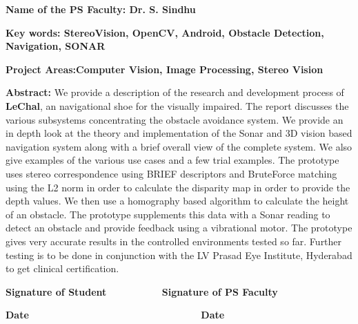 \documentclass[11pt]{report}
\begin{document}
{
\textbf{Name of the PS Faculty: Dr. S. Sindhu }


\bigskip

{
\textbf{Key words: StereoVision, OpenCV, Android, Obstacle Detection, Navigation, SONAR }\ }

{
\textbf{Project Areas:Computer Vision, Image Processing, Stereo Vision }\ }

{\bfseries
Abstract: }{We provide a description of the research  and development process of \textbf{LeChal}, an navigational shoe for the visually impaired. The report discusses the various subsystems concentrating the obstacle avoidance system. We provide an in depth look at the theory and implementation of the Sonar and 3D vision based navigation system along with a brief overall view of the complete system. We also give examples of the various use cases and a few trial examples. The prototype uses stereo correspondence using BRIEF\cite{brief} descriptors and BruteForce matching using the L2 norm in order to calculate the disparity map in order to provide the depth values. We then use a homography based algorithm to calculate the height of an obstacle\cite{obstacleavoidance}. The prototype supplements this data with a Sonar reading to detect an obstacle and provide feedback using a vibrational motor. The prototype gives very accurate results in the controlled environments tested so far. Further testing is to be done in conjunction with the LV Prasad Eye Institute, Hyderabad to get clinical certification.}


\bigskip


\bigskip


\bigskip


\bigskip


\bigskip


\bigskip


\bigskip


\bigskip


\bigskip





{\bfseries
Signature of Student\ \ \ \ \ \ \ \ \ \ Signature of PS Faculty}


\bigskip


\bigskip

{\bfseries
Date\ \ \ \ \ \ \ \ \ \ \ \ \ \ \ \ \ \ \ \ \ \ \ \ \ \ \ \ \ \ \ Date }


}
\end{document}
